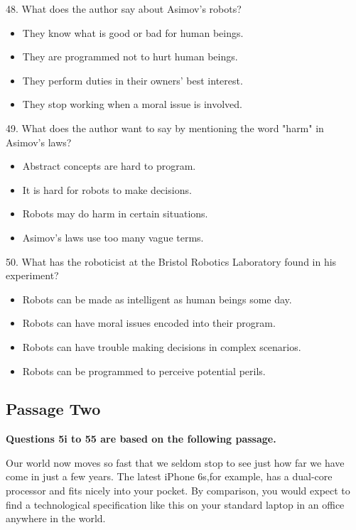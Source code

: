 \documentclass[UTF8,11pt]{ctexart}
\begin{document}
48. What does the author say about Asimov's robots?


\begin{itemize}[leftmargin=2em,itemsep=.2em,topsep=.4em]\item[A.] They know what is good or bad for human beings.
\item[B.] They are programmed not to hurt human beings.
\item[C.] They perform duties in their owners' best interest.
\item[D.] They stop working when a moral issue is involved.
\end{itemize}

49. What does the author want to say by mentioning the word "harm" in Asimov's laws?


\begin{itemize}[leftmargin=2em,itemsep=.2em,topsep=.4em]\item[A.] Abstract concepts are hard to program.
\item[B.] It is hard for robots to make decisions.
\item[C.] Robots may do harm in certain situations.
\item[D.] Asimov's laws use too many vague terms.
\end{itemize}

50. What has the roboticist at the Bristol Robotics Laboratory found in his experiment?


\begin{itemize}[leftmargin=2em,itemsep=.2em,topsep=.4em]\item[A.] Robots can be made as intelligent as human beings some day.
\item[B.] Robots can have moral issues encoded into their program.
\item[C.] Robots can have trouble making decisions in complex scenarios.
\item[D.] Robots can be programmed to perceive potential perils.
\end{itemize}

\subsection*{\textbf{Passage Two}}


\textbf{Questions 5i to 55 are based on the following passage.}


Our world now moves so fast that we seldom stop to see just how far we have come in just a few years. The latest iPhone 6s,for example, has a dual-core processor and fits nicely into your pocket. By comparison, you would expect to find a technological specification like this on your standard laptop in an office anywhere in the world.
\end{document}
